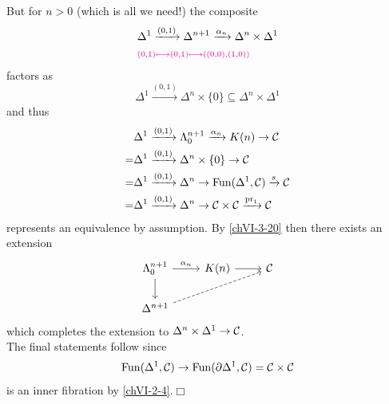         But for $n > 0$ (which is all we need!) the composite
        \begin{align*}
            &\Delta^1 \xrightarrow{(0, 1)} \Delta^{n+1} \xrightarrow{\alpha_n} \Delta^n \times \Delta^1 \\
            &{\color{magenta} \scriptstyle (0, 1) \longmapsto (0, 1) \longmapsto ((0,0),(1,0))}
        \end{align*}
        factors as
        \begin{equation*}
            \Delta^1 \xrightarrow{(0, 1)} \Delta^n \times \{ 0 \} \subseteq \Delta^n \times \Delta^1
        \end{equation*}
        and thus
        \begin{align*}
            &\Delta^1 \xrightarrow{(0, 1)} \Lambda^{n+1}_{0} \xrightarrow{\alpha_n} K(n) \rightarrow \mathcal{C} \\
            = &\Delta^1 \xrightarrow{(0, 1)} \Delta^n \times \{ 0 \} \rightarrow \mathcal{C} \\
            = &\Delta^1 \xrightarrow{(0, 1)} \Delta^n \rightarrow \operatorname{Fun}(\Delta^1, \mathcal{C}) \xrightarrow{s} \mathcal{C} \\
            = &\Delta^1 \xrightarrow{(0, 1)} \Delta^n \rightarrow \mathcal{C} \times \mathcal{C} \xrightarrow{\operatorname{pr}_1} \mathcal{C}
        \end{align*}
        represents an equivalence by assumption. By \ref{chVI-3-20} then there exists an extension
        \begin{equation*}
            \begin{tikzcd}
                \horn{n+1}{0} \arrow[d] \arrow[r, "\alpha_n"] & K(n) \arrow[r] & \Cc \\
                \Delta^{n+1} \arrow[rru, dashed]                
            \end{tikzcd}
        \end{equation*}
        which completes the extension to $\Delta^n \times \Delta^1 \to \mathcal{C}$.\\
        The final statements follow since
        \begin{equation*}
            \operatorname{Fun}(\Delta^1, \mathcal{C}) \to \operatorname{Fun}(\partial \Delta^1, \mathcal{C}) = \mathcal{C} \times \mathcal{C}
        \end{equation*}
        is an inner fibration by \ref{chVI-2-4}.\hfill$\Box$
    

